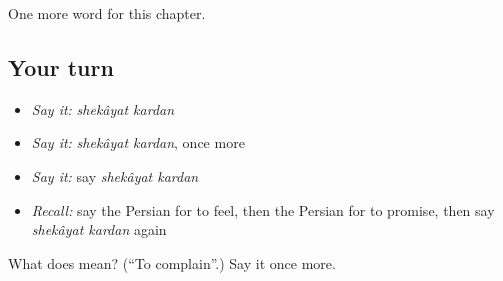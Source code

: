 \begin{grammarlens}[title={What you've built}]
One more word for this chapter.
\end{grammarlens}

\subsection*{Your turn}
\begin{itemize}
\raggedright
  \item \emph{Say it:} \emph{shekâyat kardan}
  \item \emph{Say it:} \emph{shekâyat kardan}, once more
  \item \emph{Say it:} say \emph{shekâyat kardan}
  \item \emph{Recall:} say the Persian for to feel, then the Persian for to promise, then say \emph{shekâyat kardan} again
\end{itemize}

\begin{tcolorbox}[breakable,colback=teal!4,colframe=teal!35!black,title={Before you move on}]
What does   mean? (\textquotedblleft{}To complain\textquotedblright{}.) Say it once more.
\end{tcolorbox}
